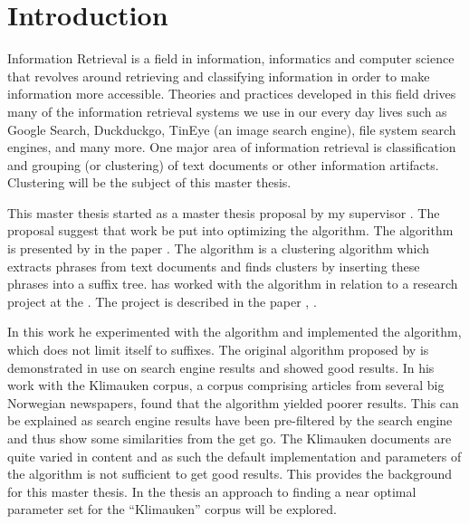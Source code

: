 
\chapter{Introduction} %

\label{Introduction}



Information Retrieval is a field in information, informatics and computer science that revolves around retrieving and classifying information in order to make information more accessible. Theories and practices developed in this field drives many of the information retrieval systems we use in our every day lives such as Google Search, Duckduckgo, TinEye (an image search engine), file system search engines, and many more. One major area of information retrieval is classification and grouping (or clustering) of text documents or other information artifacts. Clustering will be the subject of this master thesis.

This master thesis started as a master thesis proposal by my supervisor \supervisor. The proposal suggest that work be put into optimizing the \STC algorithm. The \STC algorithm is presented by \textcite{Oren1998} in the paper . The algorithm is a clustering algorithm which extracts phrases from text documents and finds clusters by inserting these phrases into a suffix tree. \supervisor has worked with the \STC algorithm in relation to a research project at the \deptname. The project is described in the paper , \cite{Elgesem2009}.

In this work he experimented with the \STC algorithm and implemented the \CTC algorithm, which does not limit itself to suffixes. The original \STC algorithm proposed by \textcite{Oren1998} is demonstrated in use on search engine results and showed good results. In his work with the Klimauken corpus, a corpus comprising articles from several big Norwegian newspapers, \supervisor found that the \STC algorithm yielded poorer results. This can be explained as search engine results have been pre-filtered by the search engine and thus show some similarities from the get go. The Klimauken documents are quite varied in content and as such the default implementation and parameters of the \STC algorithm is not sufficient to get good results. This provides the background for this master thesis. In the thesis an approach to finding a near optimal parameter set for the ``Klimauken'' corpus will be explored.

